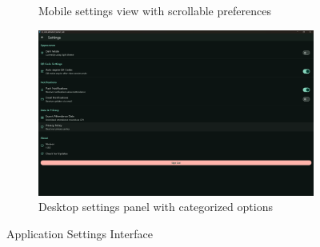 \begin{figure}[H]
\begin{subfigure}[b]{0.48\textwidth}
        \caption{Mobile settings view with scrollable preferences}
    \end{subfigure}
    \hfill
    \begin{subfigure}[b]{0.48\textwidth}
        \includegraphics[width=\textwidth]{images/rachid/teacher-side-settings-desktop.png}
        \caption{Desktop settings panel with categorized options}
    \end{subfigure}
    \caption{Application Settings Interface}
    \label{fig:settings-interface}
\end{figure}


